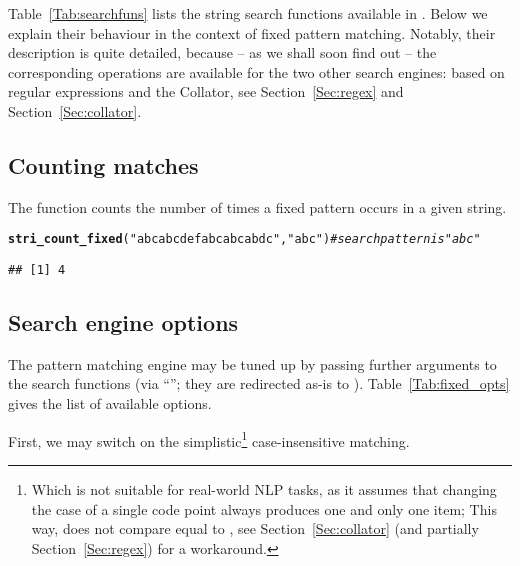\documentclass[nojss]{jss}\usepackage[]{graphicx}\usepackage[]{xcolor}
\makeatletter
\newcommand{\hlstr}[1]{\textcolor[rgb]{0.192,0.494,0.8}{#1}}%
\newcommand{\hlcom}[1]{\textcolor[rgb]{0.678,0.584,0.686}{\textit{#1}}}%
\newcommand{\hlstd}[1]{\textcolor[rgb]{0.345,0.345,0.345}{#1}}%
\newcommand{\hlkwd}[1]{\textcolor[rgb]{0.737,0.353,0.396}{\textbf{#1}}}%
\newenvironment{kframe}{%
 \def\at@end@of@kframe{}%
 \ifinner\ifhmode%
  \def\at@end@of@kframe{\end{minipage}}%
  \begin{minipage}{\columnwidth}%
 \fi\fi%
 \def\FrameCommand##1{\hskip\@totalleftmargin \hskip-\fboxsep
 \colorbox{shadecolor}{##1}\hskip-\fboxsep
     \hskip-\linewidth \hskip-\@totalleftmargin \hskip\columnwidth}%
 \MakeFramed {\advance\hsize-\width
   \@totalleftmargin\z@ \linewidth\hsize
   \@setminipage}}%
 {\par\unskip\endMakeFramed%
 \at@end@of@kframe}
\newenvironment{knitrout}{}{} %
\makeatother
\begin{document}
Table~\ref{Tab:searchfuns} lists the string search functions available
in .  Below we explain their behaviour in the context of fixed
 pattern matching. Notably, their description
is quite detailed, because -- as we shall soon find out --
the corresponding operations are available for the two other search
engines: based on regular expressions and the  Collator,
see Section~\ref{Sec:regex} and Section~\ref{Sec:collator}.






\subsection{Counting matches}

The  function counts the number of
times a fixed pattern occurs in a given string.

\begin{knitrout}
\color{fgcolor}\begin{kframe}
\begin{alltt}
\hlkwd{stri_count_fixed}\hlstd{(}\hlstr{"abcabcdefabcabcabdc"}\hlstd{,} \hlstr{"abc"}\hlstd{)}  \hlcom{# search pattern is "abc"}
\end{alltt}
\begin{verbatim}
## [1] 4
\end{verbatim}
\end{kframe}
\end{knitrout}







\subsection{Search engine options}

The pattern matching engine may be tuned up by passing
further arguments to the search functions (via ``'';
they are redirected as-is to ).
Table~\ref{Tab:fixed_opts} gives the list of available options.





First, we may switch on the simplistic\footnote{Which is not suitable
for real-world NLP tasks, as it assumes
that changing the case of a single code point always produces one and only
one item;
This way,  does not compare equal to ,
see Section~\ref{Sec:collator} (and partially Section~\ref{Sec:regex}) for a workaround.}
case-insensitive matching.
\end{document}
